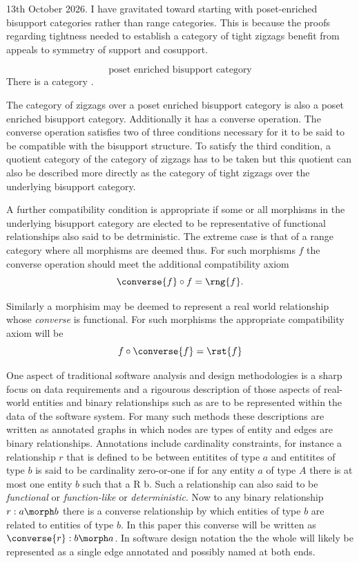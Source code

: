 
\begin{aside}
13th October 2026. I have gravitated toward starting with 
poset-enriched bisupport categories rather than range categories. 
This is  because the proofs regarding tightness needed to establish 
a category of tight zigzags benefit 
from appeals to symmetry of support and cosupport. 

\begin{equation}
\label{posetEnrichedBisupportCategory}
\text{poset enriched bisupport category}
\end{equation}
There is a category .

The category of zigzags over a poset enriched bisupport category
is also a poset enriched bisupport category. Additionally it has a converse operation. 
The converse operation  satisfies two of three conditions necessary for it to be
said to be compatible with the bisupport structure.
To satisfy the third condition, a quotient category of the category of zigzags has to be taken but this quotient can also be described more directly 
as the category of tight zigzags over the underlying bisupport category.

A further compatibility condition is appropriate if some or all morphisms in the underlying bisupport category are elected to be representative of functional
relationships also said to be detrministic. The extreme case is that of a range category where all morphisms are deemed thus. For such morphisms $f$ the converse operation should meet the additional compatibility axiom
\[
\converse{f} \circ f = \rng{f}.
\]

Similarly a morphisim may be deemed to represent a real world relationship whose \textit{converse} is functional. For such morphisms the appropriate compatibility axiom will be
\[
f \circ \converse{f} = \rst{f}
\]

One aspect of traditional software analysis and design methodologies 
is a sharp focus on data requirements 
and a rigourous description of 
those aspects of real-world entities and binary relationships 
such as are to be represented 
within the data of the software system. 
For many such methods these descriptions are written as 
annotated graphs in which nodes are types of entity and edges are binary relationships. Annotations include cardinality constraints, for instance a relationship $r$ that is defined to be between entitites of type $a$ and entitites of type $b$ is said to be cardinality zero-or-one if for any entity $a$ of type $A$ there is at most one entity $b$ such that a R b.
Such a relationship can also said to be \textit{functional} or \textit{function-like} or \textit{deterministic}. 
Now to any binary relationship $r: a \morph b$ there is a converse relationship by which entities of type $b$ are related to entities of type $b$. 
In this paper this converse 
will be written as $\converse{r} : b \morph a$. 
In software design notation the the whole will likely be represented as a single edge annotated and possibly named at both ends. 



\end{aside}
